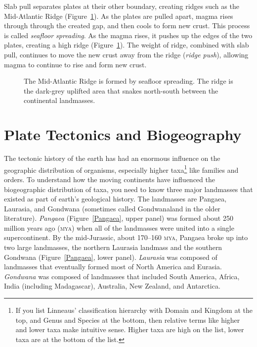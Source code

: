 \documentclass[11pt, hidelinks]{article}
\newcommand{\MYA}{\textsc{mya}}
\begin{document}
Slab pull separates plates at their other boundary, creating ridges such as the Mid-Atlantic Ridge (Figure~\ref{mid atlantic ridge}). As the plates are pulled apart, magma rises through through the created gap, and then cools to form new crust. This process is called \emph{seafloor spreading}. As the magma rises, it pushes up the edges of the two plates, creating a high ridge (Figure~\ref{mid atlantic ridge}). The weight of ridge, combined with slab pull, continues to move the new crust away from the ridge (\emph{ridge push}), allowing magma to continue to rise and form new crust.

\begin{figure}[tb]
	\centering
		\caption{The Mid-Atlantic Ridge is formed by seafloor spreading. The ridge is the dark-grey uplifted area that snakes north-south between the continental landmasses.\label{mid atlantic ridge}}
		
\end{figure}

\section{Plate Tectonics and Biogeography}

The tectonic history of the earth has had an enormous influence on the geographic distribution of organisms, especially higher taxa\footnote{If you list Linneaus' classification hierarchy with Domain and Kingdom at the top, and Genus and Species at the bottom, then relative terms like higher and lower taxa make intuitive sense. Higher taxa are high on the list, lower taxa are at the bottom of the list.} like families and orders. To understand how the moving continents have influenced the biogeographic distribution of taxa, you need to know three major landmasses that existed as part of earth's geological history. The landmasses are Pangaea, Laurasia, and Gondwana (sometimes called Gondwanaland in the older literature). \emph{Pangaea} (Figure~\ref{Pangaea}, upper panel) was formed about 250 million years ago (\MYA) when all of the landmasses were united into a single supercontinent. By the mid-Jurassic, about 170–160 \MYA, Pangaea broke up into two large landmasses, the northern Laurasia landmass and the southern Gondwana (Figure~\ref{Pangaea}, lower panel). \emph{Laurasia} was composed of landmasses that eventually formed most of North America and Eurasia. \emph{Gondwana} was composed of landmasses that included South America, Africa, India (including Madagascar), Australia, New Zealand, and Antarctica.
\end{document}
